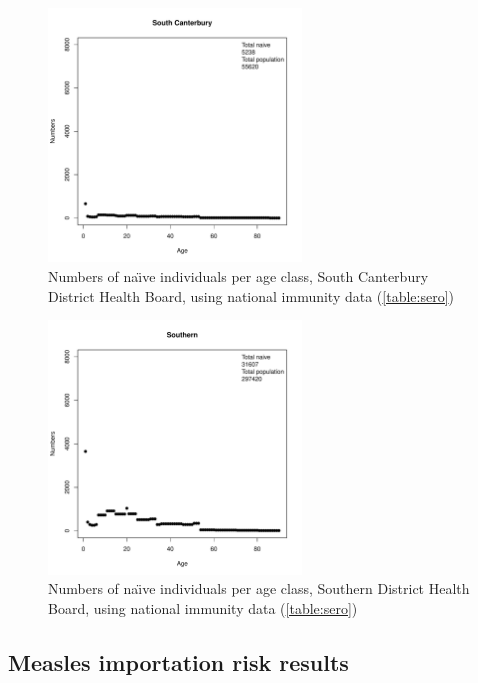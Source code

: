 \documentclass{article}
\begin{document}
\begin{figure}[H]
     \begin{center}
     \includegraphics[width=0.6\textwidth]{dhb19.pdf}
     \end{center}
     \caption{Numbers of na\"{\i}ve individuals per age class, South Canterbury District Health Board, using national immunity data (\autoref{table:sero})}
     \label{fig:SouthCanterbury}
\end{figure}

\begin{figure}[H]
     \begin{center}
     \includegraphics[width=0.6\textwidth]{dhb20.pdf}
     \end{center}
     \caption{Numbers of na\"{\i}ve individuals per age class, Southern District Health Board, using national immunity data (\autoref{table:sero})}
     \label{fig:Southern}
\end{figure}

\subsection{Measles importation risk results}
\end{document}
